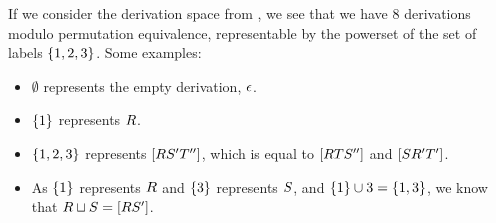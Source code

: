 \begin{example}
If we consider the derivation space from ,
we see that we have 8 derivations modulo permutation equivalence,
representable by the powerset of the set of labels $\{1, 2, 3\}$.
Some examples:
\begin{itemize}
  \item $\emptyset$ represents the empty derivation, $\epsilon$.
  \item $\{1\}$ represents $R$.
  \item $\{1, 2, 3\}$ represents $[R S' T'']$,
    which is equal to $[R T S'']$ and $[S R' T']$.
  \item As $\{1\}$ represents $R$ and $\{3\}$ represents $S$, and $\{1\} \cup {3} = \{1, 3\}$, we know that $R \sqcup S = [R S']$.
\end{itemize}
\end{example}

